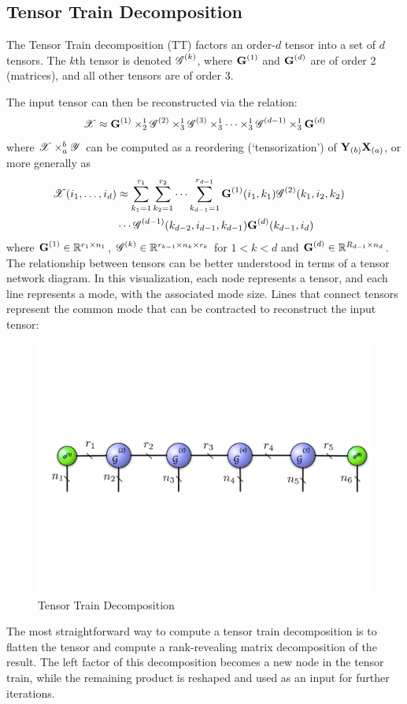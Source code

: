 \subsection{Tensor Train Decomposition}
The Tensor Train decomposition (TT) factors an order-$d$ tensor into a set of $d$ tensors. The $k$th tensor is denoted $\T{G}^{(k)}$, where $\M{G}^{(1)}$ and $\M{G}^{(d)}$ are of order 2 (matrices), and all other tensors are of order 3. 

The input tensor can then be reconstructed via the relation:
\begin{equation}
\T{X} \approx \M{G}^{(1)} \times_{2}^1 \T{G}^{(2)} \times_{3}^1 \T{G}^{(3)} \times_3^1 \dots
\times_3^1 \T{G}^{(d-1)}\times_3^1 \M{G}^{(d)} 
\end{equation}
where $\T{X} \times_a^b \T{Y}$ can be computed as a reordering (`tensorization') of $\M{Y}_{(b)} \M{X}_{(a)}$, or more generally as 
\begin{align*}
\T{X}(i_1,\dots,i_d) & \approx  
\sum_{{k_1}=1}^{r_1} \sum_{{k_2}=1}^{r_2}\cdots\sum_{{k_{d-1}}=1}^{r_{d-1}} \M{G}^{(1)}(i_1,k_1)\T{G}^{(2)}(k_1,i_2,k_2) & \\ & \cdots\T{G}^{(d-1)}(k_{d-2},i_{d-1},k_{d-1})\M{G}^{(d)}(k_{d-1},i_d)
\end{align*}
where $\M{G}^{(1)}\in \R^{r_1\times n_1}$, $\T{G}^{(k)} \in \R^{r_{k-1}\times n_k \times r_k}$ for $1< k< d$ and $\M{G}^{(d)}\in \R^{R_{d-1}\times n_d}$. The relationship between tensors can be better understood in terms of a tensor network diagram. In this visualization, each node represents a tensor, and each line represents a mode, with the associated mode size. Lines that connect tensors represent the common mode that can be contracted to reconstruct the input tensor:
\begin{figure}[htbp]
    \center\includegraphics[width=0.80\linewidth]{thpropfigs/tensortrain}
    \caption{Tensor Train Decomposition}
\end{figure}
The most straightforward way to compute a tensor train decomposition is to flatten the tensor and compute a rank-revealing matrix decomposition of the result. The left factor of this decomposition becomes a new node in the tensor train, while the remaining product is reshaped and used as an input for further iterations. 

